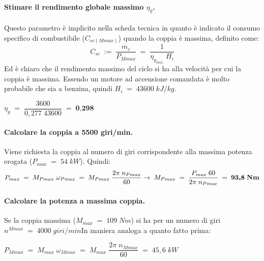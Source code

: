 \documentclass[a4paper, twoside, 12pt]{report}
\begin{document}
\paragraph{Stimare il rendimento globale massimo $\eta_{g}$.\\}
Questo parametro è implicito nella scheda tecnica in quanto è indicato il consumo specifico di  combustibile ($C_{sc(Mmax)}$) quando la coppia è massima, definito come:
\begin{equation}
	C_{sc}\;:=\;\dfrac{\dot{m_{c}}}{P_{Mmax}}\;=\;\dfrac{1}{\eta_{g_{max}}\;H_{i}}
\end{equation}
Ed è chiaro che il rendimento massimo del ciclo si ha alla velocità per cui la coppia è massima. Essendo un motore ad accensione comandata è molto probabile che sia a benzina, quindi $H_{i}\;=\;43600\;kJ/kg$.
\begin{center}
	$\eta_{g}\;=\;\dfrac{3600}{0,277\;43600}\;=\;\textbf{0,298}$
\end{center}
\paragraph{Calcolare la coppia a 5500 giri/min.\\}
Viene richiesta la coppia al numero di giri corrispondente alla massima potenza erogata ($P_{max}\;=\;54\;kW$). Quindi:
\begin{equation}
	P_{max}\;=\;M_{Pmax}\;\omega_{Pmax}\;=\;M_{Pmax}\;\dfrac{2\pi\;n_{Pmax}}{60}\to\;M_{Pmax}\;=\;\dfrac{P_{max}\;60}{2\pi\;n_{Pmax}}\;=\;\textbf{93,8\;Nm}
\end{equation}
\paragraph{Calcolare la potenza a massima coppia.\\}
Se la coppia massima ($M_{max}\;=\;109\;Nm$) si ha per un numero di giri $n^{Mmax}\;=\;4000\;giri/min$In maniera analoga a quanto fatto prima:
\begin{center}
	$P_{Mmax}\;=\;M_{max}\;\omega_{Mmax}\;=\;M_{max}\;\dfrac{2\pi\;n_{Mmax}}{60}\;=\;45,6\;kW$
\end{center}
\end{document}
